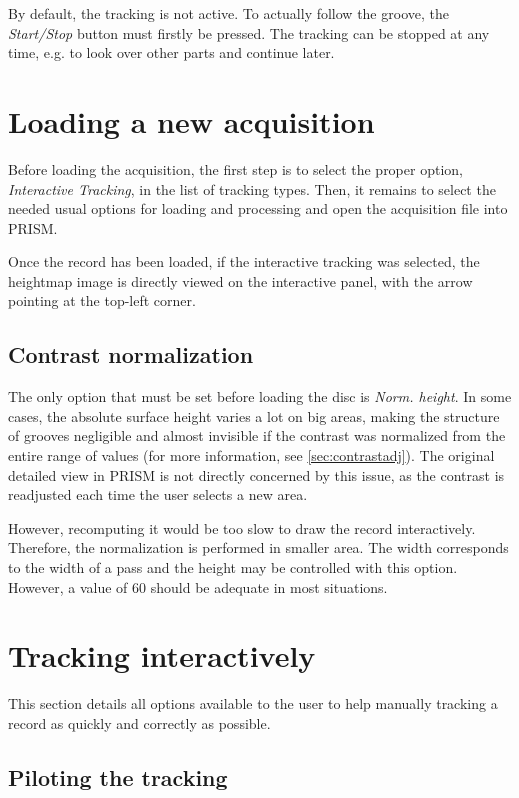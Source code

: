 By default, the tracking is not active. To actually follow the groove, the \emph{Start/Stop} button must firstly be pressed. The tracking can be stopped at any time, e.g. to look over other parts and continue later.

\section{Loading a new acquisition}

Before loading the acquisition, the first step is to select the proper option, \emph{Interactive Tracking}, in the list of tracking types. Then, it remains to select the needed usual options for loading and processing and open the acquisition file into PRISM.

Once the record has been loaded, if the interactive tracking was selected, the heightmap image is directly viewed on the interactive panel, with the arrow pointing at the top-left corner.

\subsection{Contrast normalization}
\label{sec:contrastnorm}

The only option that must be set before loading the disc is \emph{Norm. height}. In some cases, the absolute surface height varies a lot on big areas, making the structure of grooves negligible and almost invisible if the contrast was normalized from the entire range of values (for more information, see \autoref{sec:contrastadj}). The original detailed view in PRISM is not directly concerned by this issue, as the contrast is readjusted each time the user selects a new area.

However, recomputing it would be too slow to draw the record interactively. Therefore, the normalization is performed in smaller area. The width corresponds to the width of a pass and the height may be controlled with this option. However, a value of 60 should be adequate in most situations.

\section{Tracking interactively}

This section details all options available to the user to help manually tracking a record as quickly and correctly as possible.

\subsection{Piloting the tracking}

